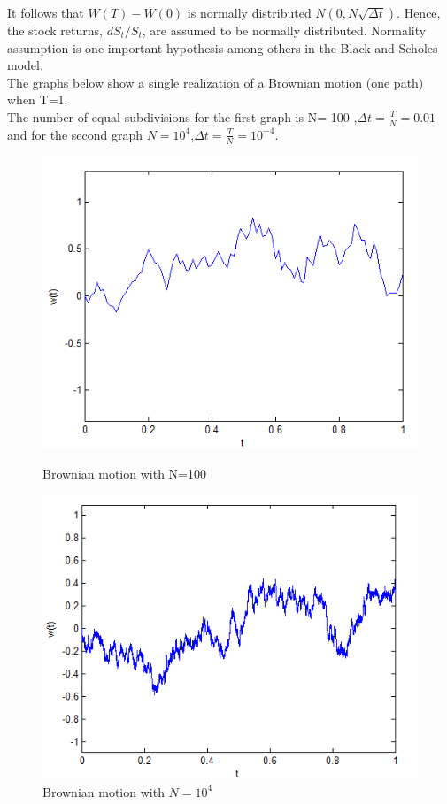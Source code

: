 \documentclass[12pt]{report}
\begin{document}
  It follows that $W(T)-W(0)$ is normally distributed $N(0,N\sqrt{\Delta t})$. Hence, the stock returns, $dS_t/S_t$, are assumed to be normally distributed. Normality assumption is one important hypothesis among others in the Black and Scholes model.\\

The graphs below show a single realization of a Brownian motion (one path) when T=1.\\
The number of equal subdivisions for the first graph is N= 100 ,$\Delta t=\frac{T}{N}=0.01$ and for the second graph $N=10^4$,$\Delta t=\frac{T}{N}=10^{-4}$.

\begin{figure}[!htb]
  \includegraphics[width=\linewidth]{brownian.png}
\caption{Brownian motion with N=100}
\endminipage\hfill
{}
  \includegraphics[width=\linewidth]{brownianN.png}
  \caption{Brownian motion with $N=10^4$}
\endminipage\hfill
\end{figure}
\end{document}
